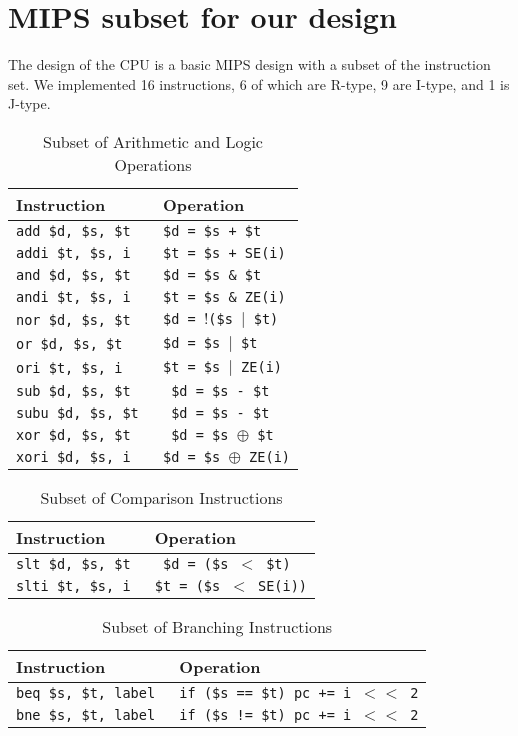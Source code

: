 \documentclass[12pt]{report}
\begin{document}
\section{MIPS subset for our design}
The design of the CPU is a basic MIPS design with
a subset of the instruction set. We implemented
16 instructions, 6 of which are R-type, 9 are I-type,
and 1 is J-type.

\begin{longtable}{|p{5cm}|p{7cm}|}
\caption{Subset of Arithmetic and Logic Operations}\\\hline
\textbf{Instruction}&\textbf{Operation}\\\hline
\texttt{add \$d, \$s, \$t}&\texttt{\$d = \$s + \$t}\\\hline
\texttt{addi \$t, \$s, i }&\texttt{\$t = \$s + SE(i)}\\\hline
\texttt{and \$d, \$s, \$t }&\texttt{\$d = \$s \& \$t}\\\hline
\texttt{andi \$t, \$s, i }&\texttt{\$t = \$s \& ZE(i)}\\\hline
\texttt{nor \$d, \$s, \$t} &\texttt{\$d = $!$(\$s $|$ \$t)}\\\hline
\texttt{or \$d, \$s, \$t }& \texttt{\$d = \$s $|$  \$t}\\\hline
\texttt{ori \$t, \$s, i }&\texttt{\$t = \$s $|$  ZE(i)}\\\hline
\texttt{sub \$d, \$s, \$t }&\texttt{ \$d = \$s - \$t}\\\hline
\texttt{subu \$d, \$s, \$t }&\texttt{ \$d = \$s - \$t}\\\hline
\texttt{xor \$d, \$s, \$t }&\texttt{ \$d = \$s $\oplus$ \$t}\\\hline
\texttt{xori \$d, \$s, i }&\texttt{\$d = \$s $\oplus$ ZE(i)}\\\hline
\end{longtable}

\begin{longtable}{|p{5cm}|p{7cm}|}
\caption{Subset of Comparison Instructions}\\\hline
\textbf{Instruction}&\textbf{Operation}\\\hline
\texttt{slt \$d, \$s, \$t }&\texttt{ \$d = (\$s $<$ \$t)}\\\hline
\texttt{slti \$t, \$s, i }&\texttt{\$t = (\$s $<$ SE(i))}\\\hline
\end{longtable}

\begin{longtable}{|p{5cm}|p{7cm}|}
\caption{Subset of Branching Instructions}\\\hline
\textbf{Instruction}&\textbf{Operation}\\\hline
\texttt{beq \$s, \$t, label }&\texttt{if (\$s == \$t) pc += i $<<$ 2}\\\hline
\texttt{bne \$s, \$t, label }&\texttt{if (\$s != \$t) pc += i $<<$ 2}\\\hline
\end{longtable}
\end{document}
